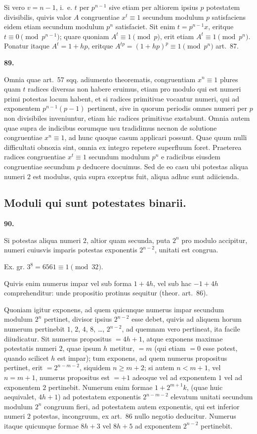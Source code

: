 \documentclass[12pt,a4paper]{article}
\theoremstyle{plain}
\theoremstyle{definition}
\theoremstyle{remark}
\begin{document}
Si vero $v=n-1$, i.~e. $t$ per $p^{n-1}$ sive etiam per altiorem ipsius $p$ potestatem divisibilis, quivis valor $A$ congruentiae $x^t \equiv 1$ secundum modulum $p$ satisfaciens eidem etiam secundum modulum $p^n$ satisfaciet. Sit enim $t=p^{n-1}x$, eritque $t \equiv 0 \pmod{p^{n-1}}$; quare quoniam $A^t \equiv 1 \pmod{p}$, erit etiam $A^t \equiv 1 \pmod{p^n}$. Ponatur itaque $A^t = 1+hp$, eritque $A^{tp} = (1+hp)^p \equiv 1 \pmod{p^n}$ art.~87.

\setcounter{satz}{89}
\addtocounter{satz}{-1}
\textbf{89.}

Omnia quae art.~57 sqq. adiumento theorematis, congruentiam $x^n \equiv 1$ plures quam $t$ radices diversas non habere eruimus, etiam pro modulo qui est numeri primi potestas locum habent, et si radices primitivae vocantur numeri, qui ad exponentem $p^{n-1}(p-1)$ pertinent, sive in quorum periodis omnes numeri per $p$ non divisibiles inveniuntur, etiam hic radices primitivae exstabunt. Omnia autem quae supra de indicibus eorumque usu tradidimus necnon de solutione congruentiae $x^n \equiv 1$, ad hunc quoque casum applicari possunt. Quae quum nulli difficultati obnoxia sint, omnia ex integro repetere superfluum foret. Praeterea radices congruentiae $x^t \equiv 1$ secundum modulum $p^n$ e radicibus eiusdem congruentiae secundum $p$ deducere docuimus. Sed de eo casu ubi potestas aliqua numeri $2$ est modulus, quia supra exceptus fuit, aliqua adhuc sunt adiicienda.

\subsection*{Moduli qui sunt potestates binarii.}

\setcounter{satz}{90}
\addtocounter{satz}{-1}
\textbf{90.}

Si potestas aliqua numeri $2$, altior quam secunda, puta $2^n$ pro modulo accipitur, numeri cuiusvis imparis potestas exponentis $2^{n-2}$, unitati est congrua.

Ex. gr. $3^8 = 6561 \equiv 1 \pmod{32}$.

Quivis enim numerus impar vel sub forma $1+4h$, vel sub hac $-1+4h$ comprehenditur: unde propositio protinus sequitur (theor. art.~86).

Quoniam igitur exponens, ad quem quicunque numerus impar secundum modulum $2^n$ pertinet, divisor ipsius $2^{n-2}$ esse debet, quivis ad aliquem horum numerum pertinebit $1$, $2$, $4$, $8$, \ldots, $2^{n-2}$, ad quemnam vero pertineat, ita facile diiudicatur. Sit numerus propositus $=4h+1$, atque exponens maximae potestatis numeri $2$, quae ipsum $h$ metitur, $=m$ (qui etiam $=0$ esse potest, quando scilicet $h$ est impar); tum exponens, ad quem numerus propositus pertinet, erit $=2^{n-m-2}$, siquidem $n \geq m+2$; si autem $n<m+1$, vel $n=m+1$, numerus propositus est $=+1$ adeoque vel ad exponentem $1$ vel ad exponentem $2$ pertinebit. Numerum enim formae $1+2^{m+1}k$, (quae huic aequivalet, $4h+1$) ad potestatem exponentis $2^{n-m-2}$ elevatum unitati secundum modulum $2^n$ congruum fieri, ad potestatem autem exponentis, qui est inferior numeri $2$ potestas, incongruum, ex art.~86 nullo negotio deducitur. Numerus itaque quicunque formae $8h+3$ vel $8h+5$ ad exponentem $2^{n-2}$ pertinebit.
\end{document}
